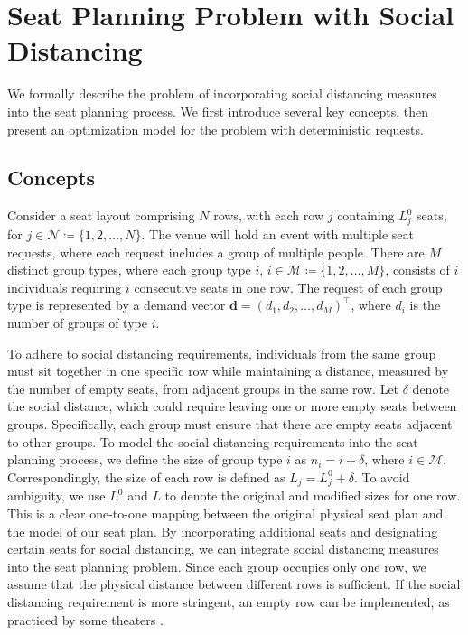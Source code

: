 \section{Seat Planning Problem with Social Distancing}\label{problem_description}
We formally describe the problem of incorporating social distancing measures into the seat planning process. We first introduce several key concepts, then present an optimization model for the problem with deterministic requests.

\subsection{Concepts}
Consider a seat layout comprising $N$ rows, with each row $j$ containing $L_j^0$ seats, for  $j \in \mathcal{N} \coloneqq \{1,2, \ldots, N\}$. The venue will hold an event with multiple seat requests, where each request includes a group of multiple people.
There are $M$ distinct group types, where each group type $i$, $i \in \mathcal{M} \coloneqq \{1, 2, \ldots, M\}$, consists of $i$ individuals requiring $i$ consecutive seats in one row. The request of each group type is represented by a demand vector $\mathbf{d} = (d_1, d_2, \ldots, d_M)^{\intercal}$, where $d_i$ is the number of groups of type $i$.

To adhere to social distancing requirements, individuals from the same group must sit together in one specific row while maintaining a distance, measured by the number of empty seats, from adjacent groups in the same row.
Let $\delta$ denote the social distance, which could require leaving one or more empty seats between groups. Specifically, each group must ensure that there are empty seats adjacent to other groups. To model the social distancing requirements into the seat planning process, we define the size of group type $i$ as $n_i = i + \delta$, where $i \in \mathcal{M}$. Correspondingly, the size of each row is defined as $L_j = L_j^{0} + \delta$. To avoid ambiguity, we use $L^{0}$ and $L$ to denote the original and modified sizes for one row. This is a clear one-to-one mapping between the original physical seat plan and the model of our seat plan. By incorporating additional seats and designating certain seats for social distancing, we can integrate social distancing measures into the seat planning problem.
Since each group occupies only one row, we assume that the physical distance between different rows is sufficient. If the social distancing requirement is more stringent, an empty row can be implemented, as practiced by some theaters \citep{Berlin_theater}.

